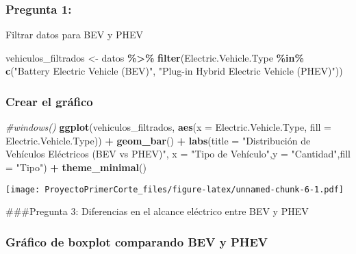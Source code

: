 \documentclass[
]{article}
\newenvironment{Shaded}{\begin{snugshade}}{\end{snugshade}}
\newcommand{\AttributeTok}[1]{\textcolor[rgb]{0.13,0.29,0.53}{#1}}
\newcommand{\CommentTok}[1]{\textcolor[rgb]{0.56,0.35,0.01}{\textit{#1}}}
\newcommand{\FunctionTok}[1]{\textcolor[rgb]{0.13,0.29,0.53}{\textbf{#1}}}
\newcommand{\NormalTok}[1]{#1}
\newcommand{\OtherTok}[1]{\textcolor[rgb]{0.56,0.35,0.01}{#1}}
\newcommand{\SpecialCharTok}[1]{\textcolor[rgb]{0.81,0.36,0.00}{\textbf{#1}}}
\newcommand{\StringTok}[1]{\textcolor[rgb]{0.31,0.60,0.02}{#1}}
\begin{document}
\subsubsection{Pregunta 1:}\label{pregunta-1}

Filtrar datos para BEV y PHEV

\begin{Shaded}
\begin{Highlighting}[]
\NormalTok{vehiculos\_filtrados }\OtherTok{\textless{}{-}}\NormalTok{ datos }\SpecialCharTok{\%\textgreater{}\%}
  \FunctionTok{filter}\NormalTok{(Electric.Vehicle.Type }\SpecialCharTok{\%in\%} \FunctionTok{c}\NormalTok{(}\StringTok{"Battery Electric Vehicle (BEV)"}\NormalTok{, }\StringTok{"Plug{-}in Hybrid Electric Vehicle (PHEV)"}\NormalTok{))}
\end{Highlighting}
\end{Shaded}

\subsubsection{Crear el gráfico}\label{crear-el-gruxe1fico}

\begin{Shaded}
\begin{Highlighting}[]
\CommentTok{\#windows()}
\FunctionTok{ggplot}\NormalTok{(vehiculos\_filtrados, }\FunctionTok{aes}\NormalTok{(}\AttributeTok{x =}\NormalTok{ Electric.Vehicle.Type, }\AttributeTok{fill =}\NormalTok{ Electric.Vehicle.Type)) }\SpecialCharTok{+}
  \FunctionTok{geom\_bar}\NormalTok{() }\SpecialCharTok{+}
  \FunctionTok{labs}\NormalTok{(}\AttributeTok{title =} \StringTok{"Distribución de Vehículos Eléctricos (BEV vs PHEV)"}\NormalTok{,}
       \AttributeTok{x =} \StringTok{"Tipo de Vehículo"}\NormalTok{,}\AttributeTok{y =} \StringTok{"Cantidad"}\NormalTok{,}\AttributeTok{fill =} \StringTok{"Tipo"}\NormalTok{) }\SpecialCharTok{+}  \FunctionTok{theme\_minimal}\NormalTok{()}
\end{Highlighting}
\end{Shaded}

\texttt{[image: ProyectoPrimerCorte\_files/figure-latex/unnamed-chunk-6-1.pdf]}

\#\#\#Pregunta 3: Diferencias en el alcance eléctrico entre BEV y PHEV

\subsubsection{Gráfico de boxplot comparando BEV y
PHEV}\label{gruxe1fico-de-boxplot-comparando-bev-y-phev}
\end{document}
